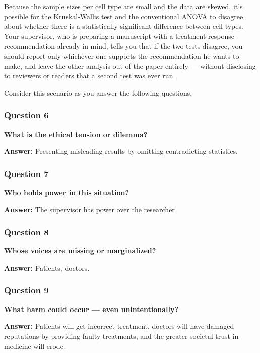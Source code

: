 \documentclass[
]{article}
\begin{document}
Because the sample sizes per cell type are small and the data are
skewed, it's possible for the Kruskal-Wallis test and the conventional
ANOVA to disagree about whether there is a statistically significant
difference between cell types. Your supervisor, who is preparing a
manuscript with a treatment-response recommendation already in mind,
tells you that if the two tests disagree, you should report only
whichever one supports the recommendation he wants to make, and leave
the other analysis out of the paper entirely --- without disclosing to
reviewers or readers that a second test was ever run.

Consider this scenario as you answer the following questions.

\subsubsection{Question 6}\label{question-6}

\textbf{What is the ethical tension or dilemma?}

\textbf{Answer:} Presenting misleading results by omitting contradicting
statistics.

\subsubsection{Question 7}\label{question-7}

\textbf{Who holds power in this situation?}

\textbf{Answer:} The supervisor has power over the researcher

\subsubsection{Question 8}\label{question-8}

\textbf{Whose voices are missing or marginalized?}

\textbf{Answer:} Patients, doctors.

\subsubsection{Question 9}\label{question-9}

\textbf{What harm could occur --- even unintentionally?}

\textbf{Answer:} Patients will get incorrect treatment, doctors will
have damaged reputations by providing faulty treatments, and the greater
societal trust in medicine will erode.
\end{document}

